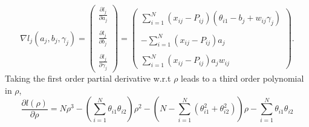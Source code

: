 \documentclass[doc]{apa7}
\begin{document}
  \begin{equation}
  \label{eq:lik_eq_a_b_gamma}
    \nabla l_j(a_j,b_j,\gamma_j) =
    \begin{pmatrix}
      \frac{\partial l_j}{\partial a_j}\\
      \\
      \frac{\partial l_j}{\partial b_j}\\
      \\
      \frac{\partial l_j}{\partial \gamma_j}
    \end{pmatrix}=
    \begin{pmatrix}
      \sum_{i=1}^{N} (x_{ij} - P_{ij})(\theta_{i1}-b_j+w_{ij}\gamma_j)\\
      \\
      -\sum_{i=1}^{N} (x_{ij} - P_{ij})a_j\\
      \\
      \sum_{i=1}^{N} (x_{ij} - P_{ij})a_j w_{ij}
    \end{pmatrix}.
  \end{equation}
  Taking the first order partial derivative w.r.t $\rho$ leads to a third order
  polynomial in $\rho$,
  \begin{equation}
  \label{eq:lik_eq_rho}
    \frac{\partial l(\rho)}{\partial \rho} = N\rho^3-\left(\sum_{i=1}^
    {N}\theta_{i1}\theta_{i2}\right)\rho^2 - \left(N - \sum_{i=1}^{N}
    (\theta_{i1}^2+\theta_{i2}^2)\right)\rho - \sum_{i=1}^{N}\theta_{i1}\theta_{i2}
  \end{equation}
\end{document}
